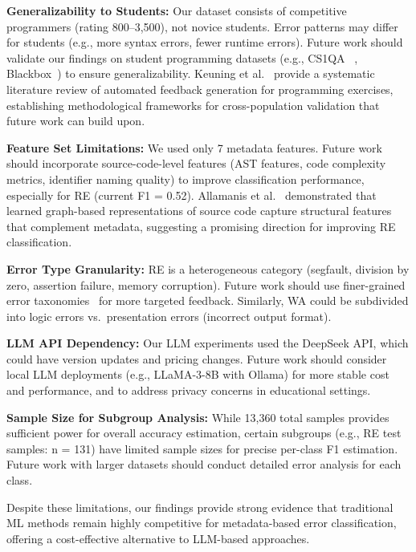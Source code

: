 \documentclass[10pt,a4paper]{article}
\begin{document}
\textbf{Generalizability to Students:} Our dataset consists of competitive
programmers (rating 800--3,500), not novice students. Error patterns may
differ for students (e.g., more syntax errors, fewer runtime errors). Future
work should validate our findings on student programming datasets (e.g., CS1QA
~\cite{lee2022cs1qa}, Blackbox~\cite{bey2022analyzing}) to ensure
generalizability. Keuning et al.~\cite{keuning2017systematic} provide a systematic
literature review of automated feedback generation for programming exercises,
establishing methodological frameworks for cross-population validation that
future work can build upon.

\textbf{Feature Set Limitations:} We used only 7 metadata features. Future
work should incorporate source-code-level features (AST features, code
complexity metrics, identifier naming quality) to improve classification
performance, especially for RE (current F1 = 0.52). Allamanis et al.~\cite{allamanis2018learning} demonstrated that learned
graph-based representations of source code capture structural features that
complement metadata, suggesting a promising direction for improving RE
classification.

\textbf{Error Type Granularity:} RE is a heterogeneous category (segfault,
division by zero, assertion failure, memory corruption). Future work should
use finer-grained error taxonomies~\cite{altadmri2015most} for more targeted
feedback. Similarly, WA could be subdivided into logic errors vs.\ presentation
errors (incorrect output format).

\textbf{LLM API Dependency:} Our LLM experiments used the DeepSeek API, which
could have version updates and pricing changes. Future work should consider
local LLM deployments (e.g., LLaMA-3-8B with Ollama) for more stable cost and
performance, and to address privacy concerns in educational settings.

\textbf{Sample Size for Subgroup Analysis:} While 13,360 total samples provides
sufficient power for overall accuracy estimation, certain subgroups (e.g., RE
test samples: n = 131) have limited sample sizes for precise per-class F1
estimation. Future work with larger datasets should conduct detailed error
analysis for each class.

Despite these limitations, our findings provide strong evidence that
traditional ML methods remain highly competitive for metadata-based error
classification, offering a cost-effective alternative to LLM-based approaches.

\end{document}

